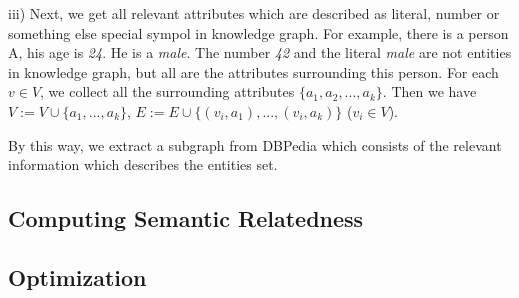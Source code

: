 iii) Next, we get all relevant attributes which are described as literal, number or something 
else special sympol in knowledge graph. For example, there is a person A, his age is \emph{24}. He is a \emph{male}.
The number \emph{42} and the literal \emph{male} are not entities in knowledge graph,
but all are the attributes surrounding this person.
For each $v \in V$, we collect all the surrounding attributes 
$\{a_1, a_2, ..., a_k\}$. Then we have $V:=V \cup \{a_1, ..., a_k\}$, 
$E:=E \cup \{(v_i, a_1), ..., (v_i, a_k)\}$ ($v_i \in V$).

By this way, we extract a subgraph from DBPedia which consists of the relevant information which describes
the entities set.

\subsection{Computing Semantic Relatedness}

\cite{corr/Ledell17}

\cite{aaai/BordesWCB11}


\subsection{Optimization}
\cite{acl/IacobacciPN15}